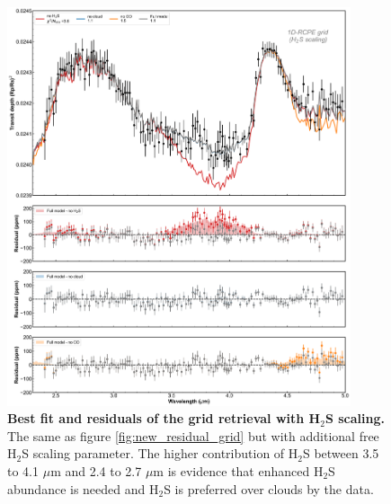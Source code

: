 \documentclass[sn-standardnature]{sn-jnl}%
\begin{document}
\begin{figure}
\centering
  \includegraphics[width=0.9\textwidth,keepaspectratio]{figs/SI_Fig3.png}
  \caption{\textbf{Best fit and residuals of the grid retrieval with H$_2$S scaling.} The same as figure \ref{fig:new_residual_grid} but with additional free H$_2$S scaling parameter. The higher contribution of H$_2$S between 3.5 to 4.1 $\mu$m and 2.4 to 2.7 $\mu$m is evidence that enhanced H$_2$S abundance is needed and H$_2$S is preferred over clouds by the data.}
  \label{fig:new_residual_grid_H2S}
\end{figure}
\end{document}
